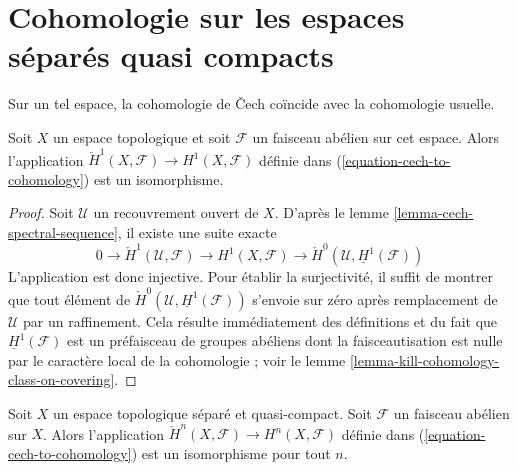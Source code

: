 




\section{Cohomologie sur les espaces séparés quasi compacts}

\label{section-cohomology-LC}

\noindent
Sur un tel espace, la cohomologie de {\v C}ech coïncide avec la cohomologie usuelle.

\begin{lemma}

\label{lemma-cech-always}

Soit $X$ un espace topologique et soit $\mathcal{F}$ un faisceau abélien sur cet espace. Alors l'application $\check{H}^1(X, \mathcal{F}) \to H^1(X, \mathcal{F})$ définie dans (\ref{equation-cech-to-cohomology}) est un isomorphisme.

\end{lemma}

\begin{proof}
Soit $\mathcal{U}$ un recouvrement ouvert de $X$. D'après le lemme \ref{lemma-cech-spectral-sequence}, il existe une suite exacte $$
0 \to \check{H}^1(\mathcal{U}, \mathcal{F}) \to H^1(X, \mathcal{F})
\to \check{H}^0(\mathcal{U}, \underline{H}^1(\mathcal{F}))
$$ L'application est donc injective. Pour établir la surjectivité, il suffit de montrer que tout élément de $\check{H}^0(\mathcal{U}, \underline{H}^1(\mathcal{F}))$ s'envoie sur zéro après remplacement de $\mathcal{U}$ par un raffinement. Cela résulte immédiatement des définitions et du fait que $\underline{H}^1(\mathcal{F})$ est un préfaisceau de groupes abéliens dont la faisceautisation est nulle par le caractère local de la cohomologie ; voir le lemme \ref{lemma-kill-cohomology-class-on-covering}.
\end{proof}

\begin{lemma}

\label{lemma-cech-Hausdorff-quasi-compact}
Soit $X$ un espace topologique séparé et quasi-compact. Soit $\mathcal{F}$ un faisceau abélien sur $X$. Alors l'application $\check{H}^n(X, \mathcal{F}) \to H^n(X, \mathcal{F})$ définie dans (\ref{equation-cech-to-cohomology}) est un isomorphisme pour tout $n$.
\end{lemma}

